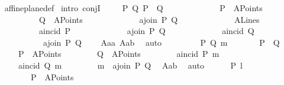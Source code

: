 \begin{isabellebody}
%
\isadelimproof
\ \ %
\endisadelimproof
%
\isatagproof
{}\isamarkupfalse%
\ affine{\isacharunderscore}{\kern0pt}plane{\isacharunderscore}{\kern0pt}def\isanewline
{}\isamarkupfalse%
\ {\isacharparenleft}{\kern0pt}intro\ conjI{\isacharparenright}{\kern0pt}\isanewline
\ \ \isamarkupfalse%
\ {}{}{\isacharcolon}{\kern0pt}\ {\isachardoublequoteopen}{\isasymforall}P\ Q{\isachardot}{\kern0pt}\ P\ {\isasymnoteq}\ Q\ {\isasymlongrightarrow}\isanewline
\ \ \ \ \ \ \ \ \ \ \ \ P\ {\isasymin}\ A{}Points\ {\isasymlongrightarrow}\isanewline
\ \ \ \ \ \ \ \ \ \ \ \ Q\ {\isasymin}\ A{}Points\ {\isasymlongrightarrow}\isanewline
\ \ \ \ \ \ \ \ \ \ \ \ a{}join\ P\ Q\isanewline
\ \ \ \ \ \ \ \ \ \ \ \ {\isasymin}\ A{}Lines\ {\isasymand}\isanewline
\ \ \ \ \ \ \ \ \ \ \ \ a{}incid\ P\isanewline
\ \ \ \ \ \ \ \ \ \ \ \ \ {\isacharparenleft}{\kern0pt}a{}join\ P\ Q{\isacharparenright}{\kern0pt}\ {\isasymand}\isanewline
\ \ \ \ \ \ \ \ \ \ \ \ a{}incid\ Q\isanewline
\ \ \ \ \ \ \ \ \ \ \ \ \ {\isacharparenleft}{\kern0pt}a{}join\ P\ Q{\isacharparenright}{\kern0pt}{\isachardoublequoteclose}\ \ \ \isamarkupfalse%
\ A{}{\isacharunderscore}{\kern0pt}a{}a\ A{}{\isacharunderscore}{\kern0pt}a{}b\ \isamarkupfalse%
\ auto\ \ \ \ \isanewline
{}\isamarkupfalse%
\isanewline
\ \ \isamarkupfalse%
\ {}{}{\isacharcolon}{\kern0pt}\ {\isachardoublequoteopen}{\isasymforall}P\ Q\ m{\isachardot}{\kern0pt}\isanewline
\ \ \ \ \ \ \ P\ {\isasymnoteq}\ Q\ {\isasymlongrightarrow}\isanewline
\ \ \ \ \ \ \ P\ {\isasymin}\ A{}Points\ {\isasymlongrightarrow}\isanewline
\ \ \ \ \ \ \ Q\ {\isasymin}\ A{}Points\ {\isasymlongrightarrow}\isanewline
\ \ \ \ \ \ \ a{}incid\ P\ m\ {\isasymlongrightarrow}\isanewline
\ \ \ \ \ \ \ a{}incid\ Q\ m\ {\isasymlongrightarrow}\isanewline
\ \ \ \ \ \ \ m\ {\isacharequal}{\kern0pt}\ a{}join\ P\ Q{\isachardoublequoteclose}\ \isamarkupfalse%
\ A{}{\isacharunderscore}{\kern0pt}a{}b\ \isamarkupfalse%
\ auto\isanewline
{}\isamarkupfalse%
\isanewline
\ \ \isamarkupfalse%
\ {}{\isacharcolon}{\kern0pt}\ {\isachardoublequoteopen}\ {\isasymforall}P\ l{\isachardot}{\kern0pt}\isanewline
\ \ \ \ \ \ \ \ \ \ P\ {\isasymin}\ A{}Points\ {\isasymlongrightarrow}\isanewline

\end{isabellebody}
